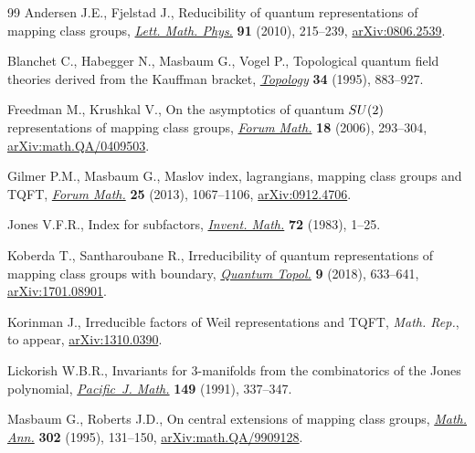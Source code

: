 \documentclass[11pt]{article}
\numberwithin{equation}{section}
\begin{document}
\begin{thebibliography}{99}
Andersen J.E., Fjelstad J., Reducibility of quantum representations of mapping
 class groups, \href{https://doi.org/10.1007/s11005-009-0367-7}{\textit{Lett. Math. Phys.}} \textbf{91} (2010), 215--239,
 \href{https://arxiv.org/abs/0806.2539}{arXiv:0806.2539}.

Blanchet C., Habegger N., Masbaum G., Vogel P., Topological quantum field
 theories derived from the {K}auffman bracket, \href{https://doi.org/10.1016/0040-9383(94)00051-4}{\textit{Topology}} \textbf{34}
 (1995), 883--927.

Freedman M., Krushkal V., On the asymptotics of quantum {${\rm SU}(2)$}
 representations of mapping class groups, \href{https://doi.org/10.1515/FORUM.2006.017}{\textit{Forum Math.}} \textbf{18}
 (2006), 293--304, \href{https://arxiv.org/abs/math.QA/0409503}{arXiv:math.QA/0409503}.

Gilmer P.M., Masbaum G., Maslov index, lagrangians, mapping class groups and
 {TQFT}, \href{https://doi.org/10.1515/form.2011.143}{\textit{Forum Math.}} \textbf{25} (2013), 1067--1106,
 \href{https://arxiv.org/abs/0912.4706}{arXiv:0912.4706}.

Jones V.F.R., Index for subfactors, \href{https://doi.org/10.1007/BF01389127}{\textit{Invent. Math.}} \textbf{72} (1983),
 1--25.

Koberda T., Santharoubane R., Irreducibility of quantum representations of
 mapping class groups with boundary, \href{https://doi.org/10.4171/QT/116}{\textit{Quantum Topol.}} \textbf{9}
 (2018), 633--641, \href{https://arxiv.org/abs/1701.08901}{arXiv:1701.08901}.

Korinman J., Irreducible factors of {W}eil representations and {TQFT},
 \textit{Math. Rep.}, {t}o appear, \href{https://arxiv.org/abs/1310.0390}{arXiv:1310.0390}.

Lickorish W.B.R., Invariants for 3-manifolds from the combinatorics of the
 {J}ones polynomial, \href{https://doi.org/10.2140/pjm.1991.149.337}{\textit{Pacific~J. Math.}} \textbf{149} (1991), 337--347.

Masbaum G., Roberts J.D., On central extensions of mapping class groups,
 \href{https://doi.org/10.1007/BF01444490}{\textit{Math. Ann.}} \textbf{302} (1995), 131--150, \href{https://arxiv.org/abs/math.QA/9909128}{arXiv:math.QA/9909128}.


\end{thebibliography}
\end{document}
